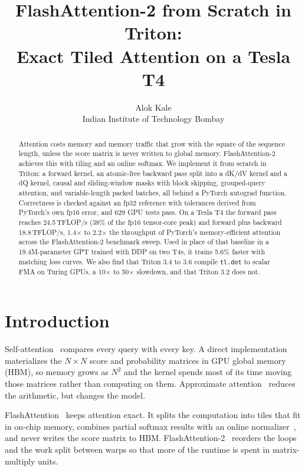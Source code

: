 \documentclass[10pt,twocolumn,letterpaper]{article}
\title{FlashAttention-2 from Scratch in Triton:\\
Exact Tiled Attention on a Tesla T4}
\author{Alok Kale\\
Indian Institute of Technology Bombay}
\newcommand{\TF}{\,TFLOP/s}
\begin{document}
\maketitle

\begin{abstract}
Attention costs memory and memory traffic that grow with the square of the
sequence length, unless the score matrix is never written to global memory.
FlashAttention-2 achieves this with tiling and an online softmax. We implement
it from scratch in Triton: a forward kernel, an atomic-free backward pass split
into a dK/dV kernel and a dQ kernel, causal and sliding-window masks with block
skipping, grouped-query attention, and variable-length packed batches, all
behind a PyTorch autograd function. Correctness is checked against an fp32
reference with tolerances derived from PyTorch's own fp16 error, and 629 GPU
tests pass. On a Tesla T4 the forward pass reaches 24.5\TF{} (38\% of the
fp16 tensor-core peak) and forward plus backward 18.8\TF{}, 1.4$\times$ to
2.2$\times$ the throughput of PyTorch's memory-efficient attention across the
FlashAttention-2 benchmark sweep. Used in place of that baseline in a
19.4M-parameter GPT trained with DDP on two T4s, it trains 5.6\% faster with
matching loss curves. We also find that Triton 3.4 to 3.6 compile
\texttt{tl.dot} to scalar FMA on Turing GPUs, a 10$\times$ to 50$\times$
slowdown, and that Triton 3.2 does not.
\end{abstract}

\section{Introduction}
\label{sec:intro}

Self-attention~\cite{vaswani2017attention} compares every query with every
key. A direct implementation materializes the $N \times N$ score and
probability matrices in GPU global memory (HBM), so memory grows as $N^2$ and
the kernel spends most of its time moving those matrices rather than
computing on them. Approximate attention~\cite{child2019sparse,
wang2020linformer, choromanski2021performer} reduces the arithmetic, but
changes the model.

FlashAttention~\cite{dao2022flashattention} keeps attention exact. It splits
the computation into tiles that fit in on-chip memory, combines partial
softmax results with an online normalizer~\cite{milakov2018online}, and never
writes the score matrix to HBM. FlashAttention-2~\cite{dao2024flashattention2}
reorders the loops and the work split between warps so that more of the
runtime is spent in matrix-multiply units.
\end{document}
